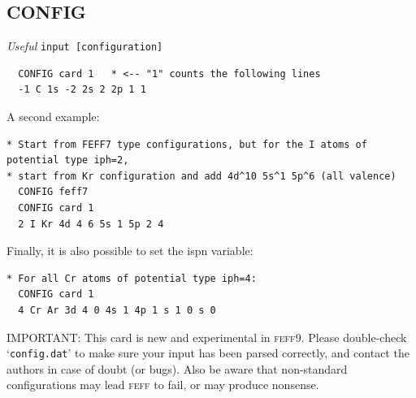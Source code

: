 \documentclass[11pt,oneside]{report} %
\newcommand{\program}[1]{\textsc{#1}}
\newcommand{\feff}{\program{feff}}
\newcommand{\vnum}{9}
\newcommand{\feffcur}{\feff\vnum}
\newenvironment{Card}[4]%
      {\vspace{3ex}%
        \subsection{#1}
        \quad\textsl{#3}\newline
        \quad\texttt{#2}\newline%
        \label{card:#4}\\}
      {}
\newcommand{\file}[1]{`\texttt{#1}'}
\begin{document}
\begin{Card}{CONFIG}{input [configuration]}{Useful}{cfg}
\begin{verbatim}
  CONFIG card 1   * <-- "1" counts the following lines
  -1 C 1s -2 2s 2 2p 1 1
\end{verbatim}
  A second example:
\begin{verbatim} 
* Start from FEFF7 type configurations, but for the I atoms of potential type iph=2, 
* start from Kr configuration and add 4d^10 5s^1 5p^6 (all valence)
  CONFIG feff7
  CONFIG card 1
  2 I Kr 4d 4 6 5s 1 5p 2 4
\end{verbatim}
  Finally, it is also possible to set the ispn variable:
\begin{verbatim}
* For all Cr atoms of potential type iph=4: 
  CONFIG card 1
  4 Cr Ar 3d 4 0 4s 1 4p 1 s 1 0 s 0
\end{verbatim}
  IMPORTANT: This card is new and experimental in {\feffcur}.  Please double-check \file{config.dat} to make sure your input has been parsed correctly, and contact the authors in case of doubt (or bugs).  Also be aware that non-standard configurations may lead {\feff} to fail, or may produce nonsense.
\end{Card}
\end{document}
